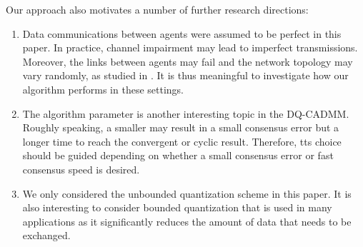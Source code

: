 \documentclass[journal]{IEEEtran}
\begin{document}
Our approach also motivates a number of further research directions:
\begin{enumerate}
\item Data communications between agents were assumed to be perfect in this paper. In practice, channel impairment may lead to imperfect transmissions. Moreover, the links between agents may fail and the network topology may vary randomly, as studied in \cite{Nedic2009,Zhu2009,Kar2010}. It is thus meaningful to investigate how our algorithm performs in these settings.
\item The algorithm parameter  is another interesting topic in the DQ-CADMM. Roughly speaking, a smaller  may result in a small consensus error but a longer time to reach the convergent or cyclic result. Therefore, tts choice should be guided depending on whether a small consensus error or fast consensus speed is desired.
\item We only considered the unbounded quantization scheme in this paper. It is also interesting to consider bounded quantization that is used in many applications as it significantly reduces the amount of data that needs to be exchanged.
\end{enumerate}
\appendices
\end{document}
